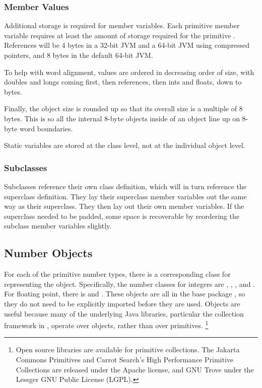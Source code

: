 \subsubsection{Member Values}

Additional storage is required for member variables.  Each primitive
member variable requires at least the amount of storage required for
the primitive .  References will be 4 bytes in
a 32-bit JVM and a 64-bit JVM using compressed pointers, and 8 bytes
in the default 64-bit JVM.

To help with word alignment, values are ordered in decreasing order of
size, with doubles and longs coming first, then references, then ints
and floats, down to bytes.

Finally, the object size is rounded up so that its overall size
is a multiple of 8 bytes.  This is so all the internal 8-byte
objects inside of an object line up on 8-byte word boundaries.

Static variables are stored at the class level, not at the individual
object level.

\subsubsection{Subclasses}

Subclasses reference their own class definition, which will in turn
reference the superclass definition.  They lay their superclass member
variables out the same way as their superclass.  They then lay out
their own member variables.  If the superclass needed to be padded, some
space is recoverable by reordering the subclass member variables
slightly.

\subsection{Number Objects}

For each of the primitive number types, there is a corresponding class
for representing the object.  Specifically, the number classes for
integers are , , , and
.  For floating point, there is  and
.  These objects are all in the base package
, so they do not need to be explicitly imported before
they are used.  Objects are useful because many of the underlying Java
libraries, particular the collection framework in ,
operate over objects, rather than over primitives.%
%
\footnote{Open source libraries are available for primitive collections.
The Jakarta Commons Primitives and Carrot Search's
High Performance Primitive Collections are released under the Apache license,
and GNU Trove under the Lessger GNU Public License (LGPL).}

